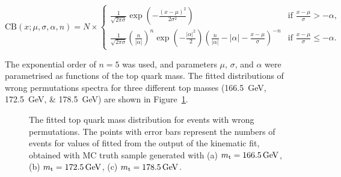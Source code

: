 \begin{equation}
\textrm{CB}(x;\mu,\sigma,\alpha,n) = N \times
\begin{cases}
\frac{1}{\sqrt{2\pi\sigma}}\exp(-\frac{(x-\mu)^2}{2\sigma^2}) & \text{if $\frac{x-\mu}{\sigma} > -\alpha$,} \\
\frac{1}{\sqrt{2\pi\sigma}}(\frac{n}{|\alpha|})^n
\exp(-\frac{|\alpha|^2}{2})(\frac{n}{|\alpha|}-|\alpha|-\frac{x-\mu}{\sigma})^{-n} & \text{if $\frac{x-\mu}{\sigma}
\leq -\alpha$.}
\end{cases}
\label{eq:crystal_ball}
\end{equation}

The exponential order of $n=\num{5}$ was used, and parameters $\mu$, $\sigma$, and $\alpha$ were parametrised as
functions of the top quark mass. The fitted distributions of wrong permutations spectra for three different top masses
(\SIlist{166.5;172.5;178.5}{\GeV}) are shown in Figure~\ref{fig:fitted_ttbar_wp_density}.

\begin{figure}[!htpb]
	\centering
	\hfill
	\caption[Fitted top quark mass distribution for \ttbar events with wrong permutations]{The fitted top quark mass
	distribution for \ttbar events with wrong permutations. The points with error bars represent the numbers of events
	for values of fitted \mtop from the output of the kinematic fit, obtained with MC truth sample generated with (a)
	$\mtop=\SI{166.5}{\GeV}$, (b) $\mtop=\SI{172.5}{\GeV}$, (c) $\mtop=\SI{178.5}{\GeV}$.}
	\label{fig:fitted_ttbar_wp_density}
\end{figure}

